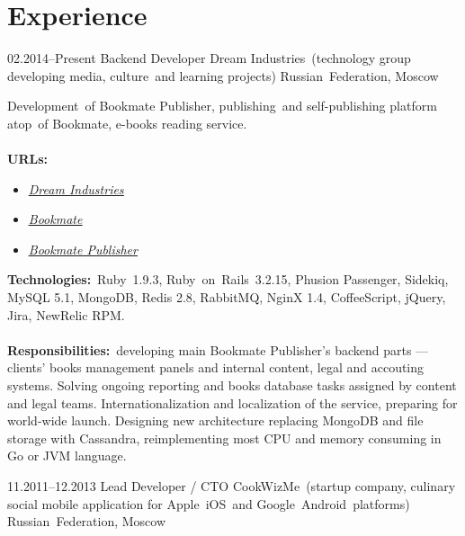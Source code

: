 \documentclass[12pt,a4paper,final]{moderncv}
\begin{document}
\section{Experience}
\cventry
{02.2014--Present}
{Backend Developer}
{Dream Industries~(technology group developing media, culture~and learning projects)}
{Russian~Federation, Moscow}
{}
{
  Development~of Bookmate Publisher, publishing~and self-publishing platform atop~of Bookmate, e-books reading service.
  \\\\
  \textbf{URLs:}
  \begin{itemize}
    \item \underline{\href{http://dreamindustries.co/}{\itshape Dream Industries}}
    \item \underline{\href{http://bookmate.com/}{\itshape Bookmate}}
    \item \underline{\href{http://publisher.bookmate.com/}{\itshape Bookmate Publisher}}
  \end{itemize}
  \bigskip
  \textbf{Technologies:}~Ruby~1.9.3, Ruby~on~Rails~3.2.15, Phusion Passenger, Sidekiq, MySQL 5.1, MongoDB, Redis 2.8, RabbitMQ, NginX 1.4, CoffeeScript, jQuery, Jira, NewRelic RPM.
  \\\\
  \textbf{Responsibilities:}~developing main Bookmate Publisher's backend parts --- clients' books management panels and internal content, legal and accouting systems. Solving ongoing reporting and books database tasks assigned by content and legal teams. Internationalization and localization of the service, preparing for world-wide launch. Designing new architecture replacing MongoDB and file storage with Cassandra, reimplementing most CPU and memory consuming in Go or JVM language.
}
\cventry
{11.2011--12.2013}
{Lead Developer / CTO}
{CookWizMe~(startup company, culinary social mobile application for Apple~iOS~and Google~Android~platforms)}
{Russian~Federation, Moscow}
{}
\end{document}
